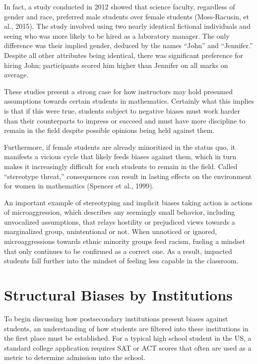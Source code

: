 In fact, a study conducted in 2012 showed that science faculty, regardless of gender and race, preferred male students over female students (Moss-Racusin, et al., 2015). The study involved using two nearly identical fictional individuals and seeing who was more likely to be hired as a laboratory manager. The only difference was their implied gender, deduced by the names ``John'' and ``Jennifer.'' Despite all other attributes being identical, there was significant preference for hiring John; participants scored him higher than Jennifer on all marks on average.

These studies present a strong case for how instructors may hold presumed assumptions towards certain students in mathematics. Certainly what this implies is that if this were true, students subject to negative biases must work harder than their counterparts to impress or succeed and must have more discipline to remain in the field despite possible opinions being held against them.

Furthermore, if female students are already minoritized in the status quo, it manifests a vicious cycle that likely feeds biases against them, which in turn makes it increasingly difficult for such students to remain in the field. Called ``stereotype threat,'' consequences can result in lasting effects on the environment for women in mathematics (Spencer et al., 1999).

An important example of stereotyping and implicit biases taking action is actions of microaggression, which describes any seemingly small behavior, including unvocalized assumptions, that relays hostility or prejudiced views towards a marginalized group, unintentional or not. When unnoticed or ignored, microaggressions towards ethnic minority groups feed racism, fueling a mindset that only continues to be confirmed as a correct one. As a result, impacted students fall further into the mindset of feeling less capable in the classroom.

\section{Structural Biases by Institutions}
To begin discussing how postsecondary institutions present biases against students, an understanding of how students are filtered into these institutions in the first place must be established. For a typical high school student in the US, a standard college application requires SAT or ACT scores that often are used as a metric to determine admission into the school.

